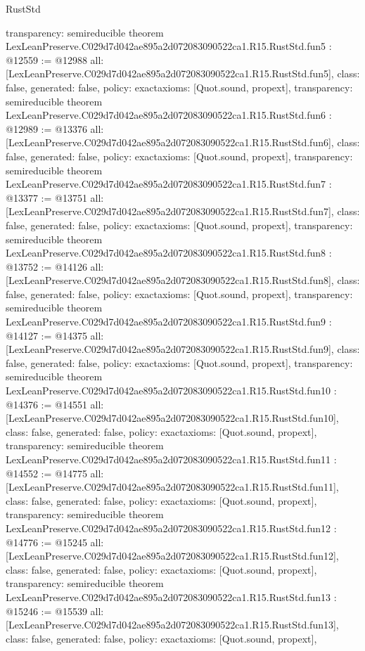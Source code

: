 \begin{lexlean}{RustStd}
\begin{coremodule}
{  transparency: semireducible
}
theorem LexLeanPreserve.C029d7d042ae895a2d072083090522ca1.R15.RustStd.fun5 : @12559 := @12988 {
  all: [LexLeanPreserve.C029d7d042ae895a2d072083090522ca1.R15.RustStd.fun5],
  class: false,
  generated: false,
  policy: exact{axioms: [Quot.sound, propext]},
  transparency: semireducible
}
theorem LexLeanPreserve.C029d7d042ae895a2d072083090522ca1.R15.RustStd.fun6 : @12989 := @13376 {
  all: [LexLeanPreserve.C029d7d042ae895a2d072083090522ca1.R15.RustStd.fun6],
  class: false,
  generated: false,
  policy: exact{axioms: [Quot.sound, propext]},
  transparency: semireducible
}
theorem LexLeanPreserve.C029d7d042ae895a2d072083090522ca1.R15.RustStd.fun7 : @13377 := @13751 {
  all: [LexLeanPreserve.C029d7d042ae895a2d072083090522ca1.R15.RustStd.fun7],
  class: false,
  generated: false,
  policy: exact{axioms: [Quot.sound, propext]},
  transparency: semireducible
}
theorem LexLeanPreserve.C029d7d042ae895a2d072083090522ca1.R15.RustStd.fun8 : @13752 := @14126 {
  all: [LexLeanPreserve.C029d7d042ae895a2d072083090522ca1.R15.RustStd.fun8],
  class: false,
  generated: false,
  policy: exact{axioms: [Quot.sound, propext]},
  transparency: semireducible
}
theorem LexLeanPreserve.C029d7d042ae895a2d072083090522ca1.R15.RustStd.fun9 : @14127 := @14375 {
  all: [LexLeanPreserve.C029d7d042ae895a2d072083090522ca1.R15.RustStd.fun9],
  class: false,
  generated: false,
  policy: exact{axioms: [Quot.sound, propext]},
  transparency: semireducible
}
theorem LexLeanPreserve.C029d7d042ae895a2d072083090522ca1.R15.RustStd.fun10 : @14376 := @14551 {
  all: [LexLeanPreserve.C029d7d042ae895a2d072083090522ca1.R15.RustStd.fun10],
  class: false,
  generated: false,
  policy: exact{axioms: [Quot.sound, propext]},
  transparency: semireducible
}
theorem LexLeanPreserve.C029d7d042ae895a2d072083090522ca1.R15.RustStd.fun11 : @14552 := @14775 {
  all: [LexLeanPreserve.C029d7d042ae895a2d072083090522ca1.R15.RustStd.fun11],
  class: false,
  generated: false,
  policy: exact{axioms: [Quot.sound, propext]},
  transparency: semireducible
}
theorem LexLeanPreserve.C029d7d042ae895a2d072083090522ca1.R15.RustStd.fun12 : @14776 := @15245 {
  all: [LexLeanPreserve.C029d7d042ae895a2d072083090522ca1.R15.RustStd.fun12],
  class: false,
  generated: false,
  policy: exact{axioms: [Quot.sound, propext]},
  transparency: semireducible
}
theorem LexLeanPreserve.C029d7d042ae895a2d072083090522ca1.R15.RustStd.fun13 : @15246 := @15539 {
  all: [LexLeanPreserve.C029d7d042ae895a2d072083090522ca1.R15.RustStd.fun13],
  class: false,
  generated: false,
  policy: exact{axioms: [Quot.sound, propext]},
}
\end{coremodule}
\end{lexlean}
